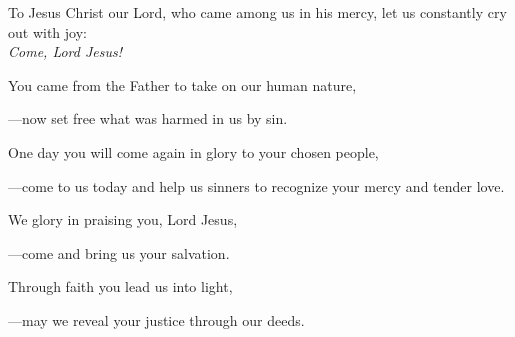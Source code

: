 \intercessions\indent

\begin{hangpar}

To Jesus Christ our Lord, who came among us in his mercy, let us constantly cry out with joy:\\
\emph{Come, Lord Jesus!}

\medskip You came from the Father to take on our human nature,

{\color{red}---\thinspace}now set free what was harmed in us by sin.

\medskip One day you will come again in glory to your chosen people,

{\color{red}---\thinspace}come to us today and help us sinners to recognize your mercy and tender love.

\medskip We glory in praising you, Lord Jesus,

{\color{red}---\thinspace}come and bring us your salvation.

\medskip Through faith you lead us into light,

{\color{red}---\thinspace}may we reveal your justice through our deeds.

\end{hangpar}